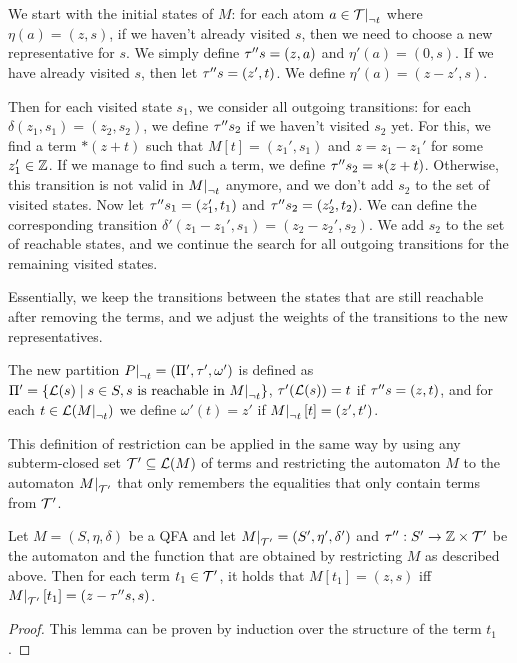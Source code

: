 We start with the initial states of $M$:
for each atom $a \in \restr{\T}{\neg t}$ where $\eta(a) = (z, s)$, if we haven't already visited $s$, then we need to choose a new representative for $s$. We simply define $\tau'' s = (z, a)$ and $\eta'(a) = (0, s)$.
If we have already visited $s$, then let $\tau'' s = (z', t)$. We define $\eta'(a) = (z - z', s)$.

Then for each visited state $s_1$, we consider all outgoing transitions: for each $\delta(z_1, s_1) = (z_2, s_2)$,
we define $\tau'' s_2$ if we haven't visited $s_2$ yet.
For this, we find a term $*(z+t)$ such that $M[t] = (z_1', s_1)$ and $z = z_1 - z_1'$ for some $z_1' \in \mathbb{Z}$.
If we manage to find such a term, we define $\tau'' s_2 = *(z+t)$.
Otherwise, this transition is not valid in $\restr{M}{\neg t}$ anymore, and we don't add $s_2$ to the set of visited states.
Now let $\tau'' s_1 = (z_1', t_1)$ and $\tau'' s_2 = (z_2', t_2)$.
We can define the corresponding transition $\delta'(z_1 - z_1', s_1) = (z_2 - z_2', s_2)$.
We add $s_2$ to the set of reachable states, and we continue the search for all outgoing transitions for the remaining visited states.

Essentially, we keep the transitions between the states that are still reachable after removing the terms, and we adjust the weights of the transitions to the new representatives.

The new partition $\restr{P}{\neg t} = (\Pi', \tau', \omega')$ is defined as $\Pi' = \{\L(s) \mid s \in S, s \text{ is reachable in $\restr{M}{\neg t}$}\}$,
$\tau' (\mathcal{L}(s)) = t$ if $\tau'' s = (z, t)$, and
for each $t \in \L(\restr{M}{\neg t})$ we define $\omega'(t) = z'$ if $\restr{M}{\neg t}[t] = (z', t')$.

This definition of restriction can be applied in the same way by using any subterm-closed set $\mathcal{T}' \subseteq \mathcal{L}(M)$ of terms and restricting the automaton $M$ to the automaton $\restr{M}{\T'}$ that only remembers the equalities that only contain terms from $\mathcal{T}'$.

\begin{lemma}\label{restriction}
    Let $M = (S, \eta, \delta)$ be a QFA and let $\restr{M}{\T'} = (S', \eta', \delta')$ and $\tau'' : S' \rightarrow \mathbb{Z} \times \mathcal{T}'$ be the automaton and the function that are obtained by restricting $M$ as described above.
    Then for each term $t_1 \in \mathcal{T}'$, it holds that $M[t_1] = (z, s)$ iff $\restr{M}{\T'}[t_1] = (z - \repr s, s)$.
\end{lemma}
\begin{proof}
    This lemma can be proven by induction over the structure of the term $t_1$.
\end{proof}

